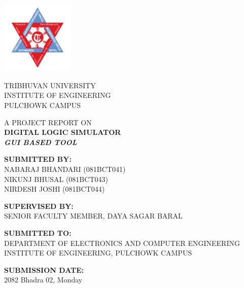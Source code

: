 \begin{titlepage}
    \begin{center}
        \includegraphics[width=3.5cm]{images/tuLogo.png}
        \vspace{0.8cm}

        {\large TRIBHUVAN UNIVERSITY} \\
        {\normalsize INSTITUTE OF ENGINEERING} \\
        {\normalsize PULCHOWK CAMPUS}
        \vspace{1cm}

        {\large A PROJECT REPORT ON} \\
        \vspace{0.4cm}
        {\LARGE \textbf{DIGITAL LOGIC SIMULATOR}} \\
        \vspace{0.2cm}
        {\normalsize \textit{\textbf{GUI BASED TOOL}}}
        \vspace{1cm}

        {\normalsize \textbf{SUBMITTED BY:}} \\
        \vspace{0.2cm}
        {\normalsize NABARAJ BHANDARI (081BCT041)} \\
        {\normalsize NIKUNJ BHUSAL (081BCT043)} \\
        {\normalsize NIRDESH JOSHI (081BCT044)}
        \vspace{0.8cm}

        {\normalsize \textbf{SUPERVISED BY:}} \\
        \vspace{0.2cm}
        {\normalsize SENIOR FACULTY MEMBER, DAYA SAGAR BARAL}
        \vspace{0.8cm}

        {\normalsize \textbf{SUBMITTED TO:}} \\
        \vspace{0.2cm}
        {\normalsize DEPARTMENT OF ELECTRONICS AND COMPUTER ENGINEERING} \\
        {\normalsize INSTITUTE OF ENGINEERING, PULCHOWK CAMPUS}
        \vspace{1cm}

        {\normalsize \textbf{SUBMISSION DATE:}} \\
        \vspace{0.2cm}
        {\normalsize 2082 Bhadra 02, Monday}
    \end{center}
\end{titlepage}